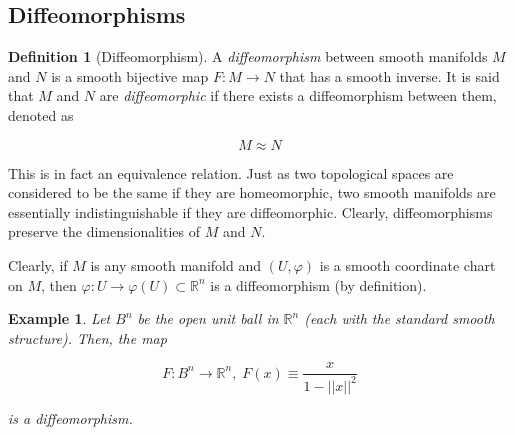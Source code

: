 \documentclass{article}
\newtheorem{example}{Example}[section]
\theoremstyle{remark}
\theoremstyle{definition}
\newtheorem{definition}{Definition}[section]
\begin{document}
  \subsection{Diffeomorphisms}

    \begin{definition}[Diffeomorphism]
      A \textit{diffeomorphism} between smooth manifolds $M$ and $N$ is a smooth bijective map $F: M \longrightarrow N$ that has a smooth inverse. It is said that $M$ and $N$ are \textit{diffeomorphic} if there exists a diffeomorphism between them, denoted as 

        \[M \approx N\]

      This is in fact an equivalence relation. Just as two topological spaces are considered to be the same if they are homeomorphic, two smooth manifolds are essentially indistinguishable if they are diffeomorphic. Clearly, diffeomorphisms preserve the dimensionalities of $M$ and $N$. 
    \end{definition}

    Clearly, if $M$ is any smooth manifold and $(U, \varphi)$ is a smooth coordinate chart on $M$, then $\varphi: U \longrightarrow \varphi(U) \subset \mathbb{R}^n$ is a diffeomorphism (by definition). 

    \begin{example}
      Let $B^n$ be the open unit ball in $\mathbb{R}^n$ (each with the standard smooth structure). Then, the map 

        \[F: B^n \longrightarrow \mathbb{R}^n, \; F(x) \equiv \frac{x}{1 - ||x||^2}\]

      is a diffeomorphism. 
    \end{example}
\end{document}
